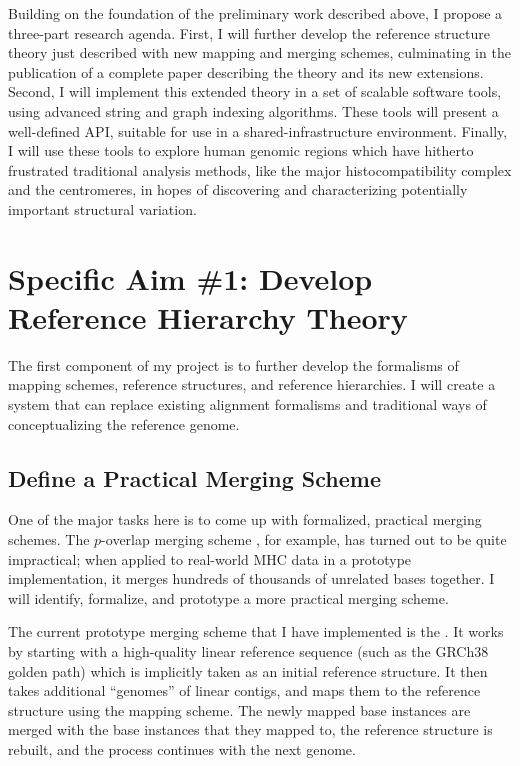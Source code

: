 \documentclass[11pt,proposal]{ucthesis}
\begin{document}
Building on the foundation of the preliminary work described above, I propose a three-part research agenda. First, I will further develop the reference structure theory just described with new mapping and merging schemes, culminating in the publication of a complete paper describing the theory and its new extensions. Second, I will implement this extended theory in a set of scalable software tools, using advanced string and graph indexing algorithms. These tools will present a well-defined API, suitable for use in a shared-infrastructure environment. Finally, I will use these tools to explore human genomic regions which have hitherto frustrated traditional analysis methods, like the major histocompatibility complex and the centromeres, in hopes of discovering and characterizing potentially important structural variation.

\section{Specific Aim \#1: Develop Reference Hierarchy Theory}

The first component of my project is to further develop the formalisms of mapping schemes, reference structures, and reference hierarchies. I will create a system that can replace existing alignment formalisms and traditional ways of conceptualizing the reference genome.

\subsection{Define a Practical Merging Scheme}
\label{subsec:aim1merging}

One of the major tasks here is to come up with formalized, practical merging schemes. The $p$-overlap merging scheme \cite{paten2014mapping}, for example, has turned out to be quite impractical; when applied to real-world MHC data in a prototype implementation, it merges hundreds of thousands of unrelated bases together. I will identify, formalize, and prototype a more practical merging scheme.

The current prototype merging scheme that I have implemented is the . It works by starting with a high-quality linear reference sequence (such as the GRCh38 golden path) which is implicitly taken as an initial reference structure. It then takes additional ``genomes'' of linear contigs, and maps them to the reference structure using the mapping scheme. The newly mapped base instances are merged with the base instances that they mapped to, the reference structure is rebuilt, and the process continues with the next genome. 
\end{document}
